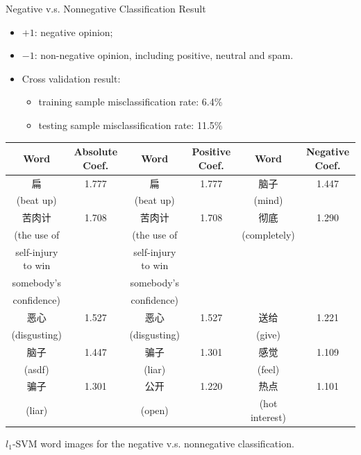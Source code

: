 \documentclass[12pt, trans]{beamer}
\newcommand{\1}[1]{{\mathbf 1}\left\{#1\right\}}        %
\begin{document}
\begin{frame}{Negative v.s. Nonnegative Classification Result}
\footnotesize
\begin{itemize}[<+->]
\item $+1$: negative opinion;
\item $-1$: non-negative opinion, including positive, neutral and spam.
\item Cross validation result: 
  \begin{itemize}[<+->]
  \item training sample misclassification rate: 6.4\%
  \item testing sample misclassification rate: 11.5\%
  \end{itemize}

\end{itemize}


\vspace{-3pt}
\tiny
\begin{tabular}{|c|c||c|c||c|c|}
\hline
Word & Absolute Coef. & Word & Positive Coef. & Word & Negative Coef.\\ \hline  \hline
扁 & 1.777 & 扁 & 1.777 & 脑子 & 1.447\\
(beat up) & & (beat up) & & (mind) & \\\hline
苦肉计 & 1.708 & 苦肉计 & 1.708 & 彻底 & 1.290\\
(the use of  & & (the use of  &  &  (completely) &  \\
self-injury to win & &  self-injury to win &  & &  \\
somebody's & & somebody's  &  & &  \\
 confidence) & &  confidence)  &  & &  \\\hline
恶心 & 1.527 & 恶心 & 1.527 & 送给 & 1.221\\
(disgusting) & & (disgusting) & & (give) & \\\hline
脑子 & 1.447 & 骗子 & 1.301 & 感觉 & 1.109\\
(asdf) & & (liar) & & (feel) & \\\hline
骗子 & 1.301 & 公开 & 1.220 & 热点 & 1.101\\
(liar) & & (open) & & (hot interest) & \\\hline
\end{tabular}
\begin{center}
$l_1$-SVM word images for the negative v.s. nonnegative classification.
\end{center}

\end{frame}
\end{document}
